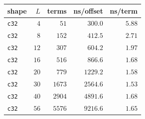 \begin{tabular}{lrrrr}
\toprule
shape & $L$ & terms & ns/offset & ns/term \\
\midrule
\texttt{c32} & $4$ & $51$ & $300.0$ & $5.88$ \\
\texttt{c32} & $8$ & $152$ & $412.5$ & $2.71$ \\
\texttt{c32} & $12$ & $307$ & $604.2$ & $1.97$ \\
\texttt{c32} & $16$ & $516$ & $866.6$ & $1.68$ \\
\texttt{c32} & $20$ & $779$ & $1229.2$ & $1.58$ \\
\texttt{c32} & $30$ & $1673$ & $2564.6$ & $1.53$ \\
\texttt{c32} & $40$ & $2904$ & $4891.6$ & $1.68$ \\
\texttt{c32} & $56$ & $5576$ & $9216.6$ & $1.65$ \\
\bottomrule
\end{tabular}
